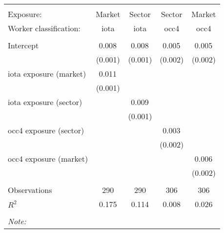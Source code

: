 \begin{tabular}{@{\extracolsep{5pt}}lcccc}
\\[-1.8ex]\hline
\hline \\[-1.8ex]
\hline \\[-1.8ex]
 Exposure: & Market & Sector & Sector & Market \\
 Worker classification: & iota & iota & occ4 & occ4 \\
 \hline &  &  &  &  \\
 Intercept & 0.008$^{}$ & 0.008$^{}$ & 0.005$^{}$ & 0.005$^{}$ \\
  & (0.001) & (0.001) & (0.002) & (0.002) \\
 iota exposure (market) & 0.011$^{}$ & & & \\
  & (0.001) & & & \\
 iota exposure (sector) & & 0.009$^{}$ & & \\
  & & (0.001) & & \\
 occ4 exposure (sector) & & & 0.003$^{}$ & \\
  & & & (0.002) & \\
 occ4 exposure (market) & & & & 0.006$^{}$ \\
  & & & & (0.002) \\
\hline \\[-1.8ex]
 Observations & 290 & 290 & 306 & 306 \\
 $R^2$ & 0.175 & 0.114 & 0.008 & 0.026 \\
\hline
\hline \\[-1.8ex]
\textit{Note:}\end{tabular}